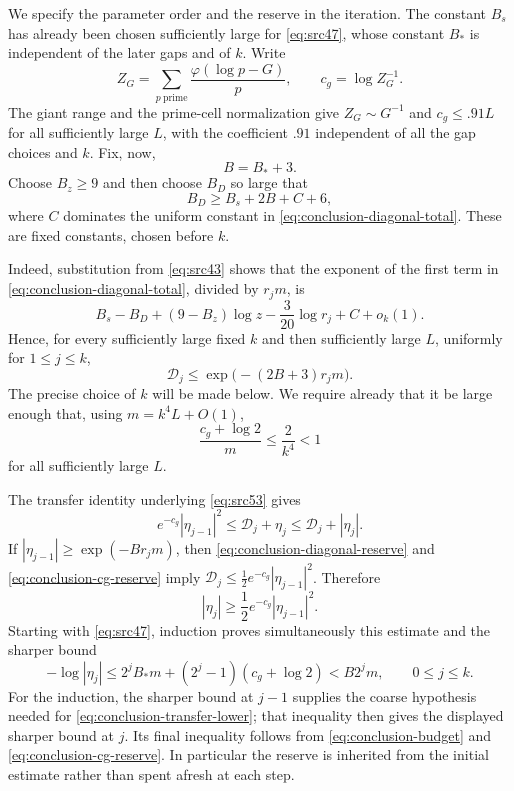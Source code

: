 We specify the parameter order and the reserve in the iteration.  The
constant $B_s$ has already been chosen sufficiently large for
\eqref{eq:src47}, whose constant $B_*$ is independent of the later gaps
and of $k$.  Write
\[
 Z_G=\sum_{p\ \mathrm{prime}}
             \frac{\varphi(\log p-G)}p,
 \qquad c_g=\log Z_G^{-1}.
\]
The giant range and the prime-cell normalization give
$Z_G\sim G^{-1}$ and $c_g\le .91L$ for all sufficiently large $L$,
with the coefficient $.91$ independent of all the gap choices and $k$.
Fix, now,
\begin{equation}\label{eq:conclusion-budget}
 B=B_*+3.
\end{equation}
Choose $B_z\ge9$ and then choose $B_D$ so large that
\begin{equation}\label{eq:conclusion-gap-choice}
 B_D\ge B_s+2B+C+6,
\end{equation}
where $C$ dominates the uniform constant in
\eqref{eq:conclusion-diagonal-total}.  These are fixed constants, chosen
before $k$.

Indeed, substitution from \eqref{eq:src43} shows that the exponent of
the first term in \eqref{eq:conclusion-diagonal-total}, divided by
$r_jm$, is
\begin{equation}\label{eq:conclusion-diagonal-rate}
 B_s-B_D+(9-B_z)\log z
       -\frac3{20}\log r_j+C+o_k(1).
\end{equation}
Hence, for every sufficiently large fixed $k$ and then sufficiently
large $L$, uniformly for $1\le j\le k$,
\begin{equation}\label{eq:conclusion-diagonal-reserve}
 \mathcal D_j\le\exp\bigl(-(2B+3)r_jm\bigr).
\end{equation}
The precise choice of $k$ will be made below.  We require already that
it be large enough that, using $m=k^4L+O(1)$,
\begin{equation}\label{eq:conclusion-cg-reserve}
 \frac{c_g+\log2}{m}\le\frac2{k^4}<1
\end{equation}
for all sufficiently large $L$.

The transfer identity underlying \eqref{eq:src53} gives
\[
 e^{-c_g}|\eta_{j-1}|^2
 \le\mathcal D_j+\eta_j
 \le\mathcal D_j+|\eta_j|.
\]
If $|\eta_{j-1}|\ge\exp(-Br_jm)$, then
\eqref{eq:conclusion-diagonal-reserve} and
\eqref{eq:conclusion-cg-reserve} imply
$\mathcal D_j\le\tfrac12 e^{-c_g}|\eta_{j-1}|^2$.  Therefore
\begin{equation}\label{eq:conclusion-transfer-lower}
 |\eta_j|\ge\frac12e^{-c_g}|\eta_{j-1}|^2.
\end{equation}
Starting with \eqref{eq:src47}, induction proves simultaneously this
estimate and the sharper bound
\begin{equation}\label{eq:conclusion-exact-recurrence}
 -\log|\eta_j|
 \le 2^jB_*m+(2^j-1)(c_g+\log2)
 <B2^jm,
 \qquad 0\le j\le k.
\end{equation}
For the induction, the sharper bound at $j-1$ supplies the coarse
hypothesis needed for \eqref{eq:conclusion-transfer-lower}; that
inequality then gives the displayed sharper bound at $j$.  Its final
inequality follows from \eqref{eq:conclusion-budget} and
\eqref{eq:conclusion-cg-reserve}.  In particular the reserve is inherited
from the initial estimate rather than spent afresh at each step.

